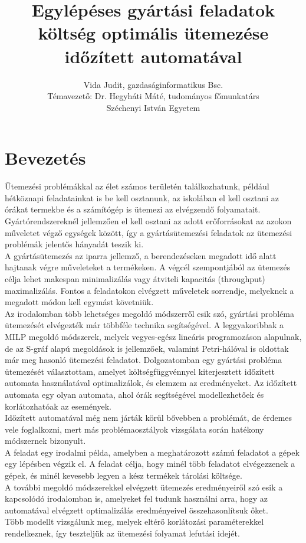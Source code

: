 \documentclass {report}
\begin{document}
\title{Egylépéses gyártási feladatok költség optimális ütemezése időzített automatával}

\author{Vida Judit, gazdaságinformatikus Bsc.\\Témavezető: Dr. Hegyháti Máté, tudományos főmunkatárs\\Széchenyi István Egyetem}
\maketitle


\tableofcontents
\chapter{Bevezetés}
Ütemezési problémákkal az élet számos területén találkozhatunk, például hétköznapi feladatainkat is be kell osztanunk, az iskolában el kell osztani az órákat termekbe és a számítógép is ütemezi az elvégzendő folyamatait. Gyártórendszereknél jellemzően el kell osztani az adott erőforrásokat az azokon műveletet végző egységek között, így a gyártásütemezési feladatok az ütemezési problémák jelentős hányadát teszik ki. \\
A gyártásütemezés az iparra jellemző, a berendezéseken megadott idő alatt hajtanak végre műveleteket a termékeken. A végcél szempontjából az ütemezés célja lehet makespan minimalizálás vagy átviteli kapacitás (throughput) maximalizálás. Fontos a feladatokon elvégzett műveletek sorrendje, melyeknek a megadott módon kell egymást követniük.\\
Az irodalomban több lehetséges megoldó módszerről esik szó, gyártási probléma ütemezését elvégezték már többféle technika segítségével. A leggyakoribbak a MILP megoldó módszerek, melyek vegyes-egész lineáris programozáson alapulnak, de az S-gráf alapú megoldások is jellemzőek, valamint Petri-hálóval is oldottak már meg hasonló ütemezési feladatot.
Dolgozatomban egy gyártási probléma ütemezését választottam, amelyet költségfüggvénnyel kiterjesztett időzített automata használatával optimalizálok, és elemzem az eredményeket. Az időzített automata egy olyan automata, ahol órák segítségével modellezhetőek és korlátozhatóak az események.\\
Időzített automatával még nem járták körül bővebben a problémát, de érdemes vele foglalkozni, mert más problémaosztályok vizsgálata során hatékony módszernek bizonyult.\\
A feladat egy irodalmi példa, amelyben a meghatározott számú feladatot a gépek egy lépésben végzik el.
A feladat célja, hogy minél több feladatot elvégezzenek a gépek, és minél kevesebb legyen a kész termékek tárolási költsége.\\
A további megoldó módszerekkel elvégzett ütemezés eredményeiről szó esik a kapcsolódó irodalomban is, amelyeket fel tudunk használni arra, hogy az automatával elvégzett optimalizálás eredményeivel összehasonlítsuk őket. \\
Több modellt vizsgálunk meg, melyek eltérő korlátozási paraméterekkel rendelkeznek, így teszteljük az ütemezési folyamat lefutási idejét.
\end{document}
